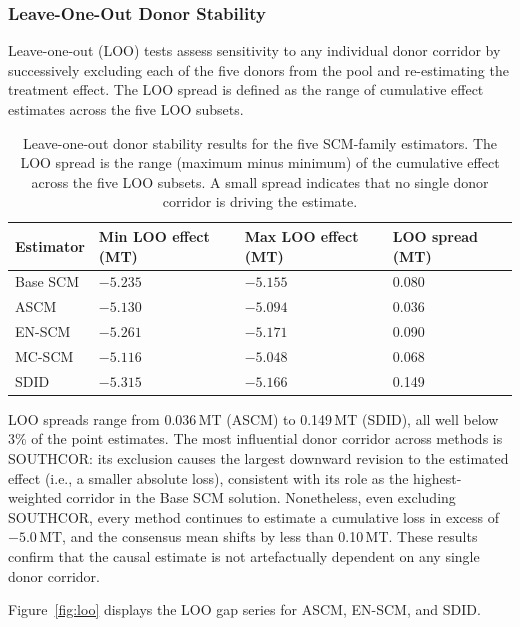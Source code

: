 \subsubsection{Leave-One-Out Donor Stability}

Leave-one-out (LOO) tests assess sensitivity to any individual donor
corridor by successively excluding each of the five donors from the
pool and re-estimating the treatment effect.
The LOO spread is defined as the range of cumulative effect estimates
across the five LOO subsets.

\begin{table}[H]
  \centering
  \caption{Leave-one-out donor stability results for the five
           SCM-family estimators.
           The LOO spread is the range (maximum minus minimum)
           of the cumulative effect across the five LOO subsets.
           A small spread indicates that no single donor corridor
           is driving the estimate.}
  \label{tab:loo}
  \begin{tabularx}{\textwidth}{lXXX}
    \toprule
    Estimator & Min LOO effect (MT) & Max LOO effect (MT)
              & LOO spread (MT) \\
    \midrule
    Base SCM  & $-5.235$ & $-5.155$ & 0.080 \\
    ASCM      & $-5.130$ & $-5.094$ & 0.036 \\
    EN-SCM    & $-5.261$ & $-5.171$ & 0.090 \\
    MC-SCM    & $-5.116$ & $-5.048$ & 0.068 \\
    SDID      & $-5.315$ & $-5.166$ & 0.149 \\
    \bottomrule
  \end{tabularx}
\end{table}

LOO spreads range from 0.036\,MT (ASCM) to 0.149\,MT (SDID), all
well below 3\% of the point estimates.
The most influential donor corridor across methods is SOUTHCOR: its
exclusion causes the largest downward revision to the estimated effect
(i.e., a smaller absolute loss), consistent with its role as the
highest-weighted corridor in the Base SCM solution.
Nonetheless, even excluding SOUTHCOR, every method continues to
estimate a cumulative loss in excess of $-5.0$\,MT, and the consensus
mean shifts by less than 0.10\,MT.
These results confirm that the causal estimate is not artefactually
dependent on any single donor corridor.

Figure~\ref{fig:loo} displays the LOO gap series for ASCM, EN-SCM,
and SDID.

